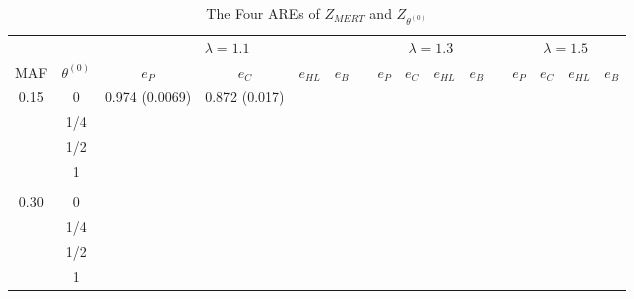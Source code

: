 \documentclass{article}
\begin{document}
\begin{table}[]
\centering
\caption{The Four AREs of $Z_{MERT}$ and $Z_{\theta^{(0)}}$}
\begin{tabular}{@{}cccccccccccccccc@{}}
\toprule
     &                       & \multicolumn{4}{c}{$\lambda=1.1$} &  & \multicolumn{4}{c}{$\lambda=1.3$} &  &\multicolumn{4}{c}{$\lambda=1.5$}\\ \cmidrule(r){3-6} \cmidrule(r){8-11}\cmidrule(r){13-16}
MAF  & $\theta^{(0)}$ & $e_P$ & $e_C$ & $e_{HL}$ & $e_B$ & & $e_P$& $e_C$ & $e_{HL}$ & $e_B$ & & $e_P$ & $e_C$ & $e_{HL}$ & $e_B$ \\ \hline
0.15 & 0              & 0.974 (0.0069)  &   0.872 (0.017)        &           &          &  &           &           &           &          &  &           &           &           &          \\
     & 1/4                   &           &           &           &          &  &           &           &           &          &  &           &           &           &          \\
     & 1/2                   &           &           &           &          &  &           &           &           &          &  &           &           &           &          \\
     & 1                     &           &           &           &          &  &           &           &           &          &  &           &           &           &          \\
     &                       &           &           &           &          &  &           &           &           &          &  &           &           &           &          \\
0.30 & 0                     &           &           &           &          &  &           &           &           &          &  &           &           &           &          \\
     & 1/4                   &           &           &           &          &  &           &           &           &          &  &           &           &           &          \\
     & 1/2                   &           &           &           &          &  &           &           &           &          &  &           &           &           &          \\
     & 1                     &           &           &           &          &  &           &           &           &          &  &           &           &           &          \\

\end{tabular}
\end{table}
\end{document}
